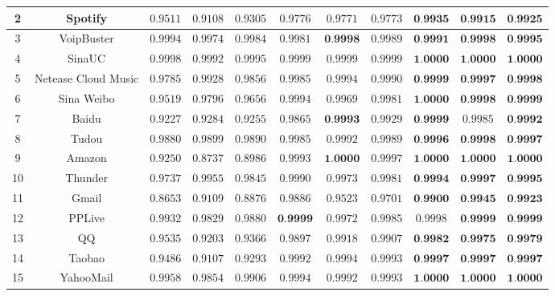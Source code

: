 \documentclass[degree=master,cjk-font=noto]{thuthesis}
\begin{document}
\begin{table}[!htp]
\begin{center}
\begin{center}
\begin{tabular}{c|c|c c c|c c c|c c c}
			2 & Spotify & $0.9511$ & $0.9108$ & $0.9305$ & $0.9776$ & $0.9771$ & $0.9773$ & $\textbf{0.9935}$ & $\textbf{0.9915}$ & $\textbf{0.9925}$ \\\hline
			3 & VoipBuster & $0.9994$ & $0.9974$ & $0.9984$ & $0.9981$ & $\textbf{0.9998}$ & $0.9989$ & $\textbf{0.9991}$ & $\textbf{0.9998}$ & $\textbf{0.9995}$ \\\hline
			4 & SinaUC & $0.9998$ & $0.9992$ & $0.9995$ & $0.9999$ & $0.9999$ & $0.9999$ & $\textbf{1.0000}$ & $\textbf{1.0000}$ & $\textbf{1.0000}$ \\\hline
			5 & Netease Cloud Music & $0.9785$ & $0.9928$ & $0.9856$ & $0.9985$ & $0.9994$ & $0.9990$ & $\textbf{0.9999}$ & $\textbf{0.9997}$ & $\textbf{0.9998}$ \\\hline
			6 & Sina Weibo & $0.9519$ & $0.9796$ & $0.9656$ & $0.9994$ & $0.9969$ & $0.9981$ & $\textbf{1.0000}$ & $\textbf{0.9998}$ & $\textbf{0.9999}$ \\\hline
			7 & Baidu & $0.9227$ & $0.9284$ & $0.9255$ & $0.9865$ & $\textbf{0.9993}$ & $0.9929$ & $\textbf{0.9999}$ & $0.9985$ & $\textbf{0.9992}$ \\\hline
			8 & Tudou & $0.9880$ & $0.9899$ & $0.9890$ & $0.9985$ & $0.9992$ & $0.9989$ & $\textbf{0.9996}$ & $\textbf{0.9998}$ & $\textbf{0.9997}$ \\\hline
			9 & Amazon & $0.9250$ & $0.8737$ & $0.8986$ & $0.9993$ & $\textbf{1.0000}$ & $0.9997$ & $\textbf{1.0000}$ & $\textbf{1.0000}$ & $\textbf{1.0000}$ \\\hline
			10 & Thunder & $0.9737$ & $0.9955$ & $0.9845$ & $0.9990$ & $0.9973$ & $0.9981$ & $\textbf{0.9994}$ & $\textbf{0.9997}$ & $\textbf{0.9995}$ \\\hline
			11 & Gmail & $0.8653$ & $0.9109$ & $0.8876$ & $0.9886$ & $0.9523$ & $0.9701$ & $\textbf{0.9900}$ & $\textbf{0.9945}$ & $\textbf{0.9923}$ \\\hline
			12 & PPLive & $0.9932$ & $0.9829$ & $0.9880$ & $\textbf{0.9999}$ & $0.9972$ & $0.9985$ & $0.9998$ & $\textbf{0.9999}$ & $\textbf{0.9999}$ \\\hline
			13 & QQ & $0.9535$ & $0.9203$ & $0.9366$ & $0.9897$ & $0.9918$ & $0.9907$ & $\textbf{0.9982}$ & $\textbf{0.9975}$ & $\textbf{0.9979}$ \\\hline
			14 & Taobao & $0.9486$ & $0.9107$ & $0.9293$ & $0.9992$ & $0.9994$ & $0.9993$ & $\textbf{0.9997}$ & $\textbf{0.9997}$ & $\textbf{0.9997}$ \\\hline
			15 & YahooMail & $0.9958$ & $0.9854$ & $0.9906$ & $0.9994$ & $0.9992$ & $0.9993$ & $\textbf{1.0000}$ & $\textbf{1.0000}$ & $\textbf{1.0000}$ \\\hline

\end{tabular}
\end{center}
\end{center}
\end{table}
\end{document}
